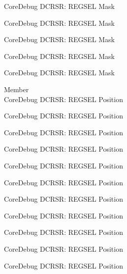 \begin{DoxyRefList}
\label{deprecated__deprecated000930}%
%
Core\+Debug DCRSR\+: REGSEL Mask 

\label{deprecated__deprecated000989}%
%
Core\+Debug DCRSR\+: REGSEL Mask 

\label{deprecated__deprecated001065}%
%
Core\+Debug DCRSR\+: REGSEL Mask 

\label{deprecated__deprecated001154}%
%
Core\+Debug DCRSR\+: REGSEL Mask 

\label{deprecated__deprecated001256}%
%
Core\+Debug DCRSR\+: REGSEL Mask  
\item[Member \doxylink{group___c_m_s_i_s___core_debug_ga52182c8a9f63a52470244c0bc2064f7b}{Core\+Debug\+\_\+\+DCRSR\+\_\+\+REGSEL\+\_\+\+Pos} ]\hfill \\
\label{deprecated__deprecated000043}%
%
Core\+Debug DCRSR\+: REGSEL Position 

\label{deprecated__deprecated000131}%
%
Core\+Debug DCRSR\+: REGSEL Position 

\label{deprecated__deprecated000187}%
%
Core\+Debug DCRSR\+: REGSEL Position 

\label{deprecated__deprecated000270}%
%
Core\+Debug DCRSR\+: REGSEL Position 

\label{deprecated__deprecated000329}%
%
Core\+Debug DCRSR\+: REGSEL Position 

\label{deprecated__deprecated000405}%
%
Core\+Debug DCRSR\+: REGSEL Position 

\label{deprecated__deprecated000494}%
%
Core\+Debug DCRSR\+: REGSEL Position 

\label{deprecated__deprecated000596}%
%
Core\+Debug DCRSR\+: REGSEL Position 

\label{deprecated__deprecated000702}%
%
Core\+Debug DCRSR\+: REGSEL Position 

\label{deprecated__deprecated000790}%
%
Core\+Debug DCRSR\+: REGSEL Position 

\label{deprecated__deprecated000846}%
%
Core\+Debug DCRSR\+: REGSEL Position 


\end{DoxyRefList}
